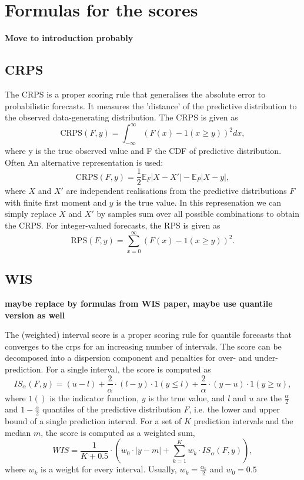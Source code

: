 \documentclass{article}
\begin{document}
\section{Formulas for the scores}
\textbf{Move to introduction probably}

\subsection{CRPS}
The CRPS is a proper scoring rule that generalises the absolute error to probabilistic forecasts. It measures the 'distance' of the predictive distribution to the observed data-generating distribution. The CRPS is given as 
$$\text{CRPS}(F, y) = \int_{-\infty}^\infty \left( F(x) - 1(x \geq y) \right)^2 dx,$$
where y is the true observed value and F the CDF of predictive distribution. Often An alternative representation is used:
$$ \text{CRPS}(F, y) = \frac{1}{2} \mathbb{E}_{F} |X - X'| - \mathbb{E}_P |X - y|,$$ where $X$ and $X'$ are independent realisations from the predictive distributions $F$ with finite first moment and $y$ is the true value. In this represenation we can simply replace $X$ and $X'$ by samples sum over all possible combinations to obtain the CRPS.  
For integer-valued forecasts, the RPS is given as 
$$ \text{RPS}(F, y) = \sum_{x = 0}^\infty (F(x) - 1(x \geq y))^2. $$

\subsection{WIS}
\textbf{maybe replace by formulas from WIS paper, maybe use quantile version as well}

The (weighted) interval score is a proper scoring rule for quantile forecasts that converges to the crps for an increasing number of intervals. The score can be decomposed into a dispersion component and penalties for over- and under-prediction. For a single interval, the score is computed as 
$$IS_\alpha(F,y) = (u-l) + \frac{2}{\alpha} \cdot (l-y) \cdot 1(y \leq l) + \frac{2}{\alpha} \cdot (y-u) \cdot 1(y \geq u), $$ 
where $1()$ is the indicator function, $y$ is the true value, and $l$ and $u$ are the $\frac{\alpha}{2}$ and $1 - \frac{\alpha}{2}$ quantiles of the predictive distribution $F$, i.e. the lower and upper bound of a single prediction interval. For a set of $K$ prediction intervals and the median $m$, the score is computed as a weighted sum, 
$$WIS = \frac{1}{K + 0.5} \cdot (w_0 \cdot |y - m| + \sum_{k = 1}^{K} w_k \cdot IS_{\alpha}(F, y)),$$ 
where $w_k$ is a weight for every interval. Usually, $w_k = \frac{\alpha_k}{2}$ and $w_0 = 0.5$
\end{document}
